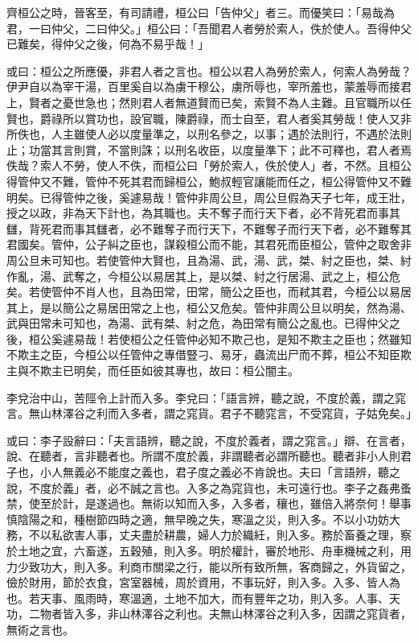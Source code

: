 \begin{pinyinscope}
齊桓公之時，晉客至，有司請禮，桓公曰「告仲父」者三。而優笑曰：「易哉為君，一曰仲父，二曰仲父。」桓公曰：「吾聞君人者勞於索人，佚於使人。吾得仲父已難矣，得仲父之後，何為不易乎哉！」

或曰：桓公之所應優，非君人者之言也。桓公以君人為勞於索人，何索人為勞哉？伊尹自以為宰干湯，百里奚自以為虜干穆公，虜所辱也，宰所羞也，蒙羞辱而接君上，賢者之憂世急也；然則君人者無道賢而已矣，索賢不為人主難。且官職所以任賢也，爵祿所以賞功也，設官職，陳爵祿，而士自至，君人者奚其勞哉！使人又非所佚也，人主雖使人必以度量準之，以刑名參之，以事；遇於法則行，不遇於法則止；功當其言則賞，不當則誅；以刑名收臣，以度量準下；此不可釋也，君人者焉佚哉？索人不勞，使人不佚，而桓公曰「勞於索人，佚於使人」者，不然。且桓公得管仲又不難，管仲不死其君而歸桓公，鮑叔輕官讓能而任之，桓公得管仲又不難明矣。已得管仲之後，奚遽易哉！管仲非周公旦，周公旦假為天子七年，成王壯，授之以政，非為天下計也，為其職也。夫不奪子而行天下者，必不背死君而事其讎，背死君而事其讎者，必不難奪子而行天下，不難奪子而行天下者，必不難奪其君國矣。管仲，公子糾之臣也，謀殺桓公而不能，其君死而臣桓公，管仲之取舍非周公旦未可知也。若使管仲大賢也，且為湯、武，湯、武，桀、紂之臣也，桀、紂作亂，湯、武奪之，今桓公以易居其上，是以桀、紂之行居湯、武之上，桓公危矣。若使管仲不肖人也，且為田常，田常，簡公之臣也，而弒其君，今桓公以易居其上，是以簡公之易居田常之上也，桓公又危矣。管仲非周公旦以明矣，然為湯、武與田常未可知也，為湯、武有桀、紂之危，為田常有簡公之亂也。已得仲父之後，桓公奚遽易哉！若使桓公之任管仲必知不欺己也，是知不欺主之臣也；然雖知不欺主之臣，今桓公以任管仲之專借豎刁、易牙，蟲流出尸而不葬，桓公不知臣欺主與不欺主已明矣，而任臣如彼其專也，故曰：桓公闇主。

李兌治中山，苦陘令上計而入多。李兌曰：「語言辨，聽之說，不度於義，謂之窕言。無山林澤谷之利而入多者，謂之窕貨。君子不聽窕言，不受窕貨，子姑免矣。」

或曰：李子設辭曰：「夫言語辨，聽之說，不度於義者，謂之窕言。」辯、在言者，說、在聽者，言非聽者也。所謂不度於義，非謂聽者必謂所聽也。聽者非小人則君子也，小人無義必不能度之義也，君子度之義必不肯說也。夫曰「言語辨，聽之說，不度於義」者，必不誠之言也。入多之為窕貨也，未可遠行也。李子之姦弗蚤禁，使至於計，是遂過也。無術以知而入多，入多者，穰也，雖倍入將奈何！舉事慎陰陽之和，種樹節四時之適，無早晚之失，寒溫之災，則入多。不以小功妨大務，不以私欲害人事，丈夫盡於耕農，婦人力於織紝，則入多。務於畜養之理，察於土地之宜，六畜遂，五穀殖，則入多。明於權計，審於地形、舟車機械之利，用力少致功大，則入多。利商市關梁之行，能以所有致所無，客商歸之，外貨留之，儉於財用，節於衣食，宮室器械，周於資用，不事玩好，則入多。入多、皆人為也。若天事、風雨時，寒溫適，土地不加大，而有豐年之功，則入多。人事、天功，二物者皆入多，非山林澤谷之利也。夫無山林澤谷之利入多，因謂之窕貨者，無術之言也。


\end{pinyinscope}
